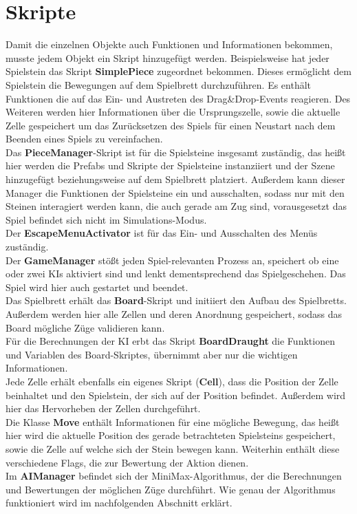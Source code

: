 \section{Skripte}
\label{ch:Implementierung:sec:Skripte}
Damit die einzelnen Objekte auch Funktionen und Informationen bekommen, musste jedem Objekt ein Skript hinzugefügt werden.
Beispielsweise hat jeder Spielstein das Skript \textbf{SimplePiece} zugeordnet bekommen. Dieses ermöglicht dem Spielstein die Bewegungen auf dem Spielbrett durchzuführen. Es enthält Funktionen die auf das Ein- und Austreten des Drag\&Drop-Events reagieren. Des Weiteren werden hier Informationen über die Ursprungszelle, sowie die aktuelle Zelle gespeichert um das Zurücksetzen des Spiels für einen Neustart nach dem Beenden eines Spiels zu vereinfachen. \\
Das \textbf{PieceManager}-Skript ist für die Spielsteine insgesamt zuständig, das heißt hier werden die Prefabs und Skripte der Spielsteine instanziiert und der Szene hinzugefügt beziehungsweise auf dem Spielbrett platziert. Außerdem kann dieser Manager die Funktionen der Spielsteine ein und ausschalten, sodass nur mit den Steinen interagiert werden kann, die auch gerade am Zug sind, vorausgesetzt das Spiel befindet sich nicht im Simulations-Modus.\\
Der \textbf{EscapeMenuActivator} ist für das Ein- und Ausschalten des Menüs zuständig.\\
Der \textbf{GameManager} stößt jeden Spiel-relevanten Prozess an, speichert ob eine oder zwei KIs aktiviert sind und lenkt dementsprechend das Spielgeschehen. Das Spiel wird hier auch gestartet und beendet.\\
Das Spielbrett erhält das \textbf{Board}-Skript und initiiert den Aufbau des Spielbretts. Außerdem werden hier alle Zellen und deren Anordnung gespeichert, sodass das Board mögliche Züge validieren kann.\\
Für die Berechnungen der KI erbt das Skript \textbf{BoardDraught} die Funktionen und Variablen des Board-Skriptes, übernimmt aber nur die wichtigen Informationen.\\
Jede Zelle erhält ebenfalls ein eigenes Skript (\textbf{Cell}), dass die Position der Zelle beinhaltet und den Spielstein, der sich auf der Position befindet. Außerdem wird hier das Hervorheben der Zellen durchgeführt.\\
Die Klasse \textbf{Move} enthält Informationen für eine mögliche Bewegung, das heißt hier wird die aktuelle Position des gerade betrachteten Spielsteins gespeichert, sowie die Zelle auf welche sich der Stein bewegen kann. Weiterhin enthält diese verschiedene Flags, die zur Bewertung der Aktion dienen.\\
Im \textbf{AIManager} befindet sich der MiniMax-Algorithmus, der die Berechnungen und Bewertungen der möglichen Züge durchführt. Wie genau der Algorithmus funktioniert wird im nachfolgenden Abschnitt erklärt.

